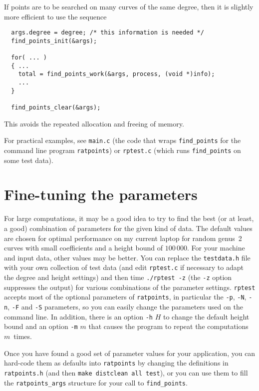 \documentclass[12pt,a4paper,oneside]{amsart}
\begin{document}
If points are to be searched on many curves of the same degree,
then it is slightly more efficient to use the sequence

\begin{verbatim}
  args.degree = degree; /* this information is needed */
  find_points_init(&args);

  for( ... )
  { ...
    total = find_points_work(&args, process, (void *)info);
    ...
  }

  find_points_clear(&args);
\end{verbatim}

This avoids the repeated allocation and freeing of memory.

For practical examples, see \texttt{main.c} (the code that wraps
\texttt{find\_points} for the command line program \texttt{ratpoints}) or
\texttt{rptest.c} (which runs \texttt{find\_points} on some test data).


\section{Fine-tuning the parameters}

For large computations, it may be a good idea to try to find the best
(or at least, a good) combination of parameters for the given kind of data.
The default values are chosen for optimal performance on my current laptop
for random genus~2 curves with small coefficients and a height bound of
$100\,000$. For your machine
and input data, other values may be better. You can replace the
\texttt{testdata.h} file with your own collection of test data (and
edit \texttt{rptest.c} if necessary to adapt the degree and height settings)
and then time \texttt{./rptest -z} (the \verb+-z+ option suppresses the output)
for various combinations of the parameter settings. \texttt{rptest} accepts
most of the optional parameters of \texttt{ratpoints}, in particular
the \verb+-p+, \verb+-N+, \verb+-n+, \verb+-F+ and \verb+-S+ parameters,
so you can easily change the parameters used on the command line. In addition,
there is an option \verb+-h+ $H$ to change the default height bound
and an option \verb+-m+ $m$ that causes the program to repeat the
computations $m$~times.

Once you have found a good set of parameter values for your application,
you can hard-code them as defaults into \texttt{ratpoints} by changing the
definitions in \texttt{ratpoints.h} (and then \texttt{make distclean all test}),
or you can use them to fill the \texttt{ratpoints\_args} structure for
your call to \texttt{find\_points}.
\end{document}
